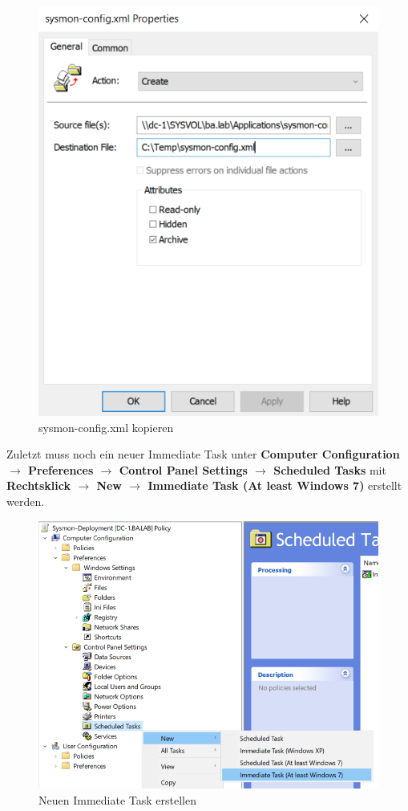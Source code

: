 \begin{minipage}{0.5\linewidth}
    \begin{figure}[H]
        \centering
        \includegraphics[width=0.7\linewidth]{../img/sysmon/config-file.png}
        \caption{sysmon-config.xml kopieren}
    \end{figure}
\end{minipage}

Zuletzt muss noch ein neuer Immediate Task unter \textbf{Computer Configuration $\rightarrow$ Preferences $\rightarrow$ Control Panel Settings $\rightarrow$ Scheduled Tasks} mit \textbf{Rechtsklick $\rightarrow$ New $\rightarrow$ Immediate Task (At least Windows 7)} erstellt werden.
\begin{figure}[H]
    \centering
    \includegraphics[width=0.7\linewidth]{../img/sysmon/new-scheduled-task.png}
    \caption{Neuen Immediate Task erstellen}
\end{figure}


